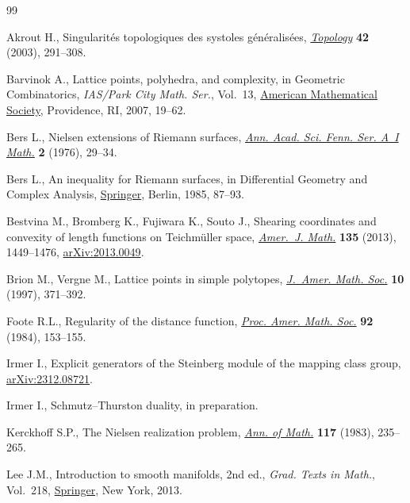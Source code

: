 \documentclass[pdftex]{sigma}
\numberwithin{equation}{section}
\begin{document}
\begin{thebibliography}{99}
\footnotesize\itemsep=0pt

Akrout H., Singularit\'es topologiques des systoles g\'en\'eralis\'ees,
 \href{https://doi.org/10.1016/S0040-9383(01)00024-6}{\textit{Topology}} \textbf{42} (2003), 291--308.

Barvinok A., Lattice points, polyhedra, and complexity, in Geometric
 {C}ombinatorics, \textit{IAS/Park City Math. Ser.}, Vol.~13, \href{https://doi.org/10.1090/pcms/013/02}{American
 Mathematical Society}, Providence, RI, 2007, 19--62.

Bers L., Nielsen extensions of {R}iemann surfaces, \href{https://doi.org/10.5186/aasfm.1976.0205}{\textit{Ann. Acad. Sci.
 Fenn. Ser. A~I Math.}} \textbf{2} (1976), 29--34.

Bers L., An inequality for {R}iemann surfaces, in Differential {G}eometry and
 {C}omplex {A}nalysis, \href{https://doi.org/10.1007/978-3-642-69828-6_7}{Springer}, Berlin, 1985, 87--93.

Bestvina M., Bromberg K., Fujiwara K., Souto J., Shearing coordinates and
 convexity of length functions on {T}eichm\"uller space, \href{https://doi.org/10.1353/ajm.2013.0049}{\textit{Amer.~J.
 Math.}} \textbf{135} (2013), 1449--1476, \href{https://arxiv.org/abs/2013.0049}{arXiv:2013.0049}.

Brion M., Vergne M., Lattice points in simple polytopes, \href{https://doi.org/10.1090/S0894-0347-97-00229-4}{\textit{J.~Amer. Math.
 Soc.}} \textbf{10} (1997), 371--392.

Foote R.L., Regularity of the distance function, \href{https://doi.org/10.2307/2045171}{\textit{Proc. Amer. Math.
 Soc.}} \textbf{92} (1984), 153--155.

Irmer I., Explicit generators of the {S}teinberg module of the mapping class
 group, \href{https://arxiv.org/abs/2312.08721}{arXiv:2312.08721}.

Irmer I., Schmutz--{T}hurston duality, {i}n preparation.

Kerckhoff S.P., The {N}ielsen realization problem, \href{https://doi.org/10.2307/2007076}{\textit{Ann. of Math.}}
 \textbf{117} (1983), 235--265.

Lee J.M., Introduction to smooth manifolds, 2nd ed., \textit{Grad. Texts in Math.}, Vol.~218, \href{https://doi.org/10.1007/978-1-4419-9982-5}{Springer}, New York, 2013.


\end{thebibliography}
\end{document}
